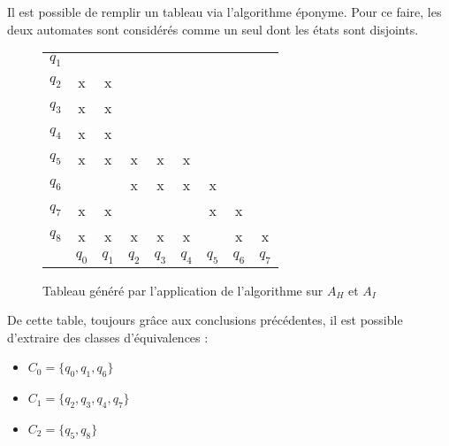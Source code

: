 	 Il est possible de remplir un tableau via l'algorithme éponyme. Pour ce faire, les deux automates sont considérés comme un seul dont les états sont disjoints.
	 
	 \begin{figure}[H]
	 	\centering
	 	\begin{tabular}{ccccccccc}
	 		\cline{2-2}
	 		\multicolumn{1}{c|}{$q_1$}&\multicolumn{1}{c|}{} &&&&&&&\\
	 		\cline{2-3}
	 		\multicolumn{1}{c|}{$q_2$}&\multicolumn{1}{c|}{x} &\multicolumn{1}{c|}{x}&&&&&&\\
	 		\cline{2-4}
	 		\multicolumn{1}{c|}{$q_3$}&\multicolumn{1}{c|}{x}&\multicolumn{1}{c|}{x}&\multicolumn{1}{c|}{}&&&&&\\
	 		\cline{2-5}
	 		\multicolumn{1}{c|}{$q_4$}&\multicolumn{1}{c|}{x}&\multicolumn{1}{c|}{x}&\multicolumn{1}{c|}{}&\multicolumn{1}{c|}{}&&&&\\
	 		\cline{2-6}
	 		\multicolumn{1}{c|}{$q_5$}&\multicolumn{1}{c|}{x}&\multicolumn{1}{c|}{x}&\multicolumn{1}{c|}{x}&\multicolumn{1}{c|}{x}&\multicolumn{1}{c|}{x}&&&\\
	 		\cline{2-7}
	 		\multicolumn{1}{c|}{$q_6$}&\multicolumn{1}{c|}{}&\multicolumn{1}{c|}{}&\multicolumn{1}{c|}{x}&\multicolumn{1}{c|}{x}&\multicolumn{1}{c|}{x}&\multicolumn{1}{c|}{x}&&\\
	 		\cline{2-8}
	 		\multicolumn{1}{c|}{$q_7$}&\multicolumn{1}{c|}{x}&\multicolumn{1}{c|}{x}&\multicolumn{1}{c|}{}&\multicolumn{1}{c|}{}&\multicolumn{1}{c|}{}&\multicolumn{1}{c|}{x}&\multicolumn{1}{c|}{x}&\\
	 		\cline{2-9}
	 		\multicolumn{1}{c|}{$q_8$}&\multicolumn{1}{c|}{x}&\multicolumn{1}{c|}{x}&\multicolumn{1}{c|}{x}&\multicolumn{1}{c|}{x}&\multicolumn{1}{c|}{x}&\multicolumn{1}{c|}{}&\multicolumn{1}{c|}{x}&\multicolumn{1}{c|}{x}\\
	 		\cline{2-9}
	 		\multicolumn{1}{c}{} & $q_0$& $q_1$ & $q_2$ & $q_3$ & $q_4$ & $q_5$ & $q_6$ & $q_7$\\
	 		
	 	\end{tabular}
	 	\caption{Tableau généré par l'application de l'algorithme sur $A_H$ et $A_I$}\label{fig:tahi}
	 \end{figure}
	 
	 De cette table, toujours grâce aux conclusions précédentes, il est possible d'extraire des classes d'équivalences : 
	 \begin{itemize}
	 	\item $C_0 = \{q_0, q_1, q_6\}$
	 	\item $C_1 = \{q_2, q_3, q_4, q_7\}$
	 	\item $C_2 = \{q_5, q_8\}$
	 \end{itemize}
	 
